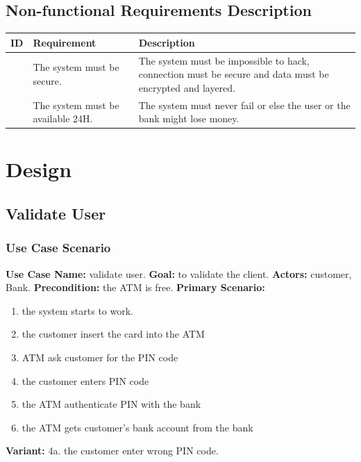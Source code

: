\documentclass{article}
\newcounter{magicrownumbers}
\newcommand\rownumber{\stepcounter{magicrownumbers}\arabic{magicrownumbers}}
\begin{document}
	\newpage\subsection{Non-functional Requirements Description}
	\setcounter{magicrownumbers}{0}
	\def\arraystretch{2}
	\begin{table}[h!]
		\begin{center}
			\begin{tabularx}{\textwidth}{r|X|X}
				\textbf{ID} & 
				\textbf{Requirement} & 
				\textbf{Description}\\
				\hline
				\rownumber &
				The system must be secure. &
				The system must be impossible to hack, connection must be secure and data must be encrypted and layered.
				\\
				\hline

				\rownumber &
				The system must be available 24H. &
				The system must never fail or else the user or the bank might lose money.
				\\
			
			\end{tabularx}
		\end{center}
	\end{table}

	\newpage\section{Design}
	\subsection{Validate User}
	\subsubsection{Use Case Scenario}
		\textbf{Use Case Name:}	validate user.
		\newline\textbf{Goal:} to validate the client.
		\newline\textbf{Actors:} customer, Bank. 	
		\newline\textbf{Precondition:} the ATM is free. 	
		\newline\textbf{Primary Scenario:}	
			\begin{enumerate}[label*=\arabic*.]
				\item the system starts to work.
				\item the customer insert the card into the ATM 
				\item ATM ask customer for the PIN code
				\item the customer enters PIN code
				\item the ATM authenticate PIN with the bank
				\item the ATM gets customer's bank account from the bank
			\end{enumerate}
		\textbf{Variant:}\newline	
			\hspace*{5mm}4a. the customer enter wrong PIN code.\newline
			
\end{document}
